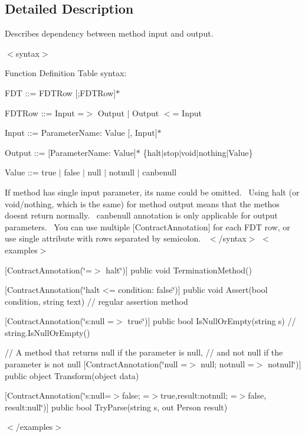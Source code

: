 \subsection{Detailed Description}
Describes dependency between method input and output. 

$<$syntax$>$ 

Function Definition Table syntax\+:


\begin{DoxyItemize}
\item F\+D\+T \+:\+:= F\+D\+T\+Row \mbox{[};F\+D\+T\+Row\mbox{]}$\ast$ 
\item F\+D\+T\+Row \+:\+:= Input =$>$ Output $\vert$ Output $<$= Input 
\item Input \+:\+:= Parameter\+Name\+: Value \mbox{[}, Input\mbox{]}$\ast$ 
\item Output \+:\+:= \mbox{[}Parameter\+Name\+: Value\mbox{]}$\ast$ \{halt$\vert$stop$\vert$void$\vert$nothing$\vert$\+Value\} 
\item Value \+:\+:= true $\vert$ false $\vert$ null $\vert$ notnull $\vert$ canbenull 
\end{DoxyItemize}If method has single input parameter, it\textquotesingle{}s name could be omitted.~\newline
 Using {\ttfamily halt} (or {\ttfamily void}/{\ttfamily nothing}, which is the same) for method output means that the methos doesn\textquotesingle{}t return normally.~\newline
 {\ttfamily canbenull} annotation is only applicable for output parameters.~\newline
 You can use multiple {\ttfamily \mbox{[}Contract\+Annotation\mbox{]}} for each F\+D\+T row, or use single attribute with rows separated by semicolon.~\newline
 $<$/syntax$>$ $<$examples$>$
\begin{DoxyItemize}
\item {\ttfamily  \mbox{[}Contract\+Annotation(\char`\"{}=$>$ halt\char`\"{})\mbox{]} public void Termination\+Method() } 
\item {\ttfamily  \mbox{[}Contract\+Annotation(\char`\"{}halt <= condition\+: false\char`\"{})\mbox{]} public void Assert(bool condition, string text) // regular assertion method } 
\item {\ttfamily  \mbox{[}Contract\+Annotation(\char`\"{}s\+:null =$>$ true\char`\"{})\mbox{]} public bool Is\+Null\+Or\+Empty(string s) // string.\+Is\+Null\+Or\+Empty() } 
\item {\ttfamily  // A method that returns null if the parameter is null, // and not null if the parameter is not null \mbox{[}Contract\+Annotation(\char`\"{}null =$>$ null; notnull =$>$ notnull\char`\"{})\mbox{]} public object Transform(object data) } 
\item {\ttfamily  \mbox{[}Contract\+Annotation(\char`\"{}s\+:null=$>$false; =$>$true,result\+:notnull; =$>$false, result\+:null\char`\"{})\mbox{]} public bool Try\+Parse(string s, out Person result) } 
\end{DoxyItemize}$<$/examples$>$ 

